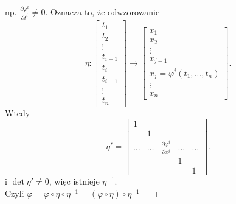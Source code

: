 \documentclass[../main.tex]{subfiles}
\begin{document}
\begin{dowod}
        np. $\frac{\partial \varphi^i}{\partial t^i} \neq 0$. Oznacza to, że odwzorowanie
        \[
            \eta : \begin{bmatrix} t_1 \\ t_2 \\ \vdots \\ t_{i-1} \\t_i \\ t_{i+1} \\ \vdots \\ t_n \end{bmatrix} \to \begin{bmatrix} x_1\\ x_2 \\ \vdots \\ x_{j-1} \\ x_j = \varphi^i (t_1,\ldots,t_n) \\ \vdots \\ x_n \end{bmatrix}
        .\]
        Wtedy
        \[
            \eta' = \begin{bmatrix} 1&&&&\\ &1&&& \\ \ldots&\ldots& \frac{\partial \varphi^i}{\partial x^i} &\ldots&\ldots \\ &&&1& \\ &&&&1\end{bmatrix}
        .\]
        i $\det \eta' \neq 0$, więc istnieje $\eta^{-1}$. \\
        Czyli $\varphi = \varphi \circ \eta \circ \eta^{-1} = (\varphi \circ \eta ) \circ \eta^{-1} \quad\Box$
    \end{dowod}
\end{document}

